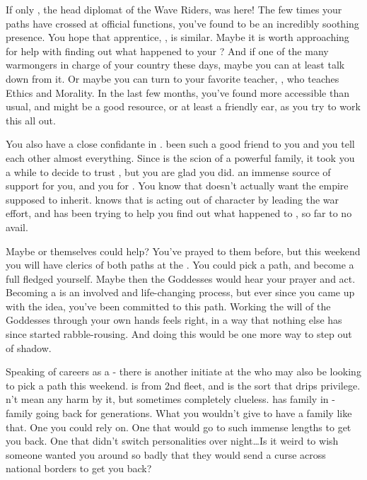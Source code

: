 \documentclass[char]{GL2020}
\begin{document}
If only \cHeadDiplomat{\full}, the head diplomat of the Wave Riders, was here! The few times your paths have crossed at official functions, you've found \cHeadDiplomat{\them} to be an incredibly soothing presence. You hope that \cHeadDiplomat{\their} apprentice, \cJuniorStatesman{\full}, is similar. Maybe it is worth approaching \cJuniorStatesman{\them} for help with finding out what happened to your \cLoud{\parent}? And if \cJuniorStatesman{\theyare} one of the many warmongers in charge of your country these days, maybe you can at least talk \cJuniorStatesman{\them} down from it. Or maybe you can turn to your favorite teacher, \cEthics{\full}, who teaches Ethics and Morality. In the last few months, you've found \cEthics{\them} more accessible than usual, and \cEthics{\they} might be a good resource, or at least a friendly ear, as you try to work this all out.

You also have a close confidante in \cHeir{\full}. \cHeir{\They} \cHeir{\have} been such a good friend to you and you tell each other almost everything. Since \cHeir{} is the scion of a powerful \pTech{} family, it took you a while to decide to trust \cHeir{\them}, but you are glad you did. \cHeir{\Theyare} an immense source of support for you, and you for \cHeir{\them}. You know that \cHeir{} doesn't actually want the empire \cHeir{\theyare} supposed to inherit. \cHeir{} knows that \cLoud{} is acting out of character by leading the war effort, and has been trying to help you find out what happened to \cLoud{\them}, so far to no avail.

Maybe \cEbb{} or \cFlow{} themselves could help? You've prayed to them before, but this weekend you will have clerics of both paths at the \pSc{}. You could pick a path, and become a full fledged \cWarlordDaughter{\cleric} yourself. Maybe then the Goddesses would hear your prayer and act. Becoming a \cWarlordDaughter{\cleric} is an involved and life-changing process, but ever since you came up with the idea, you've been committed to this path. Working the will of the Goddesses through your own hands feels right, in a way that nothing else has since \cLoud{} started rabble-rousing. And doing this would be one more way to step out of \cLoud{\their} shadow.

Speaking of careers as a \cWarlordDaughter{\cleric} - there is another initiate at the \pSchool{} who may also be looking to pick a path this weekend. \cInitiate{} is from 2nd fleet, and is the sort that drips privilege. \cInitiate{\They} \cInitiate{\does}n't mean any harm by it, but sometimes \cInitiate{\they} \cInitiate{\are} completely clueless. \cInitiate{} has family in \pFarm{} - family going back for generations. What you wouldn’t give to have a family like that. One you could rely on. One that would go to such immense lengths to get you back. One that didn’t switch personalities over night\ldots Is it weird to wish someone wanted you around so badly that they would send a curse across national borders to get you back?
\end{document}
